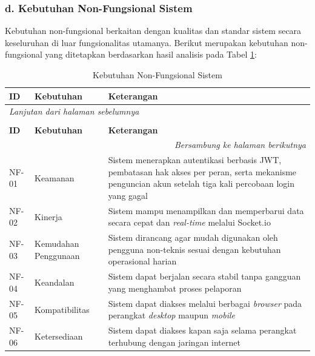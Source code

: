 \subsubsection*{d. Kebutuhan Non-Fungsional Sistem}
Kebutuhan non-fungsional berkaitan dengan kualitas dan standar sistem secara keseluruhan di luar fungsionalitas utamanya. Berikut merupakan kebutuhan non-fungsional yang ditetapkan berdasarkan hasil analisis pada Tabel \ref{table:3.nonfungsional}:

\begin{longtable}{|p{}|p{}|p{}|}
    \caption{Kebutuhan Non-Fungsional Sistem}
    \label{table:3.nonfungsional}\\
    \hline
    \textbf{ID} & \textbf{Kebutuhan} & \textbf{Keterangan} \\
    \hline
    \endfirsthead
    \multicolumn{3}{l}{\textit{Lanjutan dari halaman sebelumnya}} \\
    \caption[]{Kebutuhan Non-Fungsional Sistem} \\
    \hline
    \textbf{ID} & \textbf{Kebutuhan} & \textbf{Keterangan} \\
    \hline
    \endhead
    \hline
    \multicolumn{3}{r}{\textit{Bersambung ke halaman berikutnya}} \\
    \endfoot
    \endlastfoot
    NF-01 & Keamanan & Sistem menerapkan autentikasi berbasis JWT, pembatasan hak akses per peran, serta mekanisme penguncian akun setelah tiga kali percobaan login yang gagal \\
    \hline
    NF-02 & Kinerja & Sistem mampu menampilkan dan memperbarui data secara cepat dan \textit{real-time} melalui Socket.io \\
    \hline
    NF-03 & Kemudahan Penggunaan & Sistem dirancang agar mudah digunakan oleh pengguna non-teknis sesuai dengan kebutuhan operasional harian \\
    \hline
    NF-04 & Keandalan & Sistem dapat berjalan secara stabil tanpa gangguan yang menghambat proses pelaporan \\
    \hline
    NF-05 & Kompatibilitas & Sistem dapat diakses melalui berbagai \textit{browser} pada perangkat \textit{desktop} maupun \textit{mobile} \\
    \hline
    NF-06 & Ketersediaan & Sistem dapat diakses kapan saja selama perangkat terhubung dengan jaringan internet \\
    \hline
\end{longtable}

